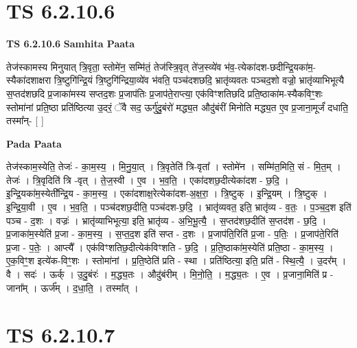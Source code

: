 \documentclass[17pt]{extarticle}
\begin{document}
\section*{ TS 6.2.10.6 }

\textbf{TS 6.2.10.6 } \newline
\textbf{Samhita Paata} \newline

तेज॑स्कामस्य मिनुयात् त्रि॒वृता॒ स्तोमे॑न॒ सम्मि॑तं॒ तेज॑स्त्रि॒वृत् ते॑ज॒स्व्ये॑व भ॑व॒-त्येका॑दश-छदीन्द्रि॒यका॑म॒-स्यैका॑दशाक्षरा त्रि॒ष्टुगि॑न्द्रि॒यं त्रि॒ष्टुगि॑न्द्रिया॒व्ये॑व भ॑वति॒ पञ्च॑दशछदि॒ भ्रातृ॑व्यवतः पञ्चद॒शो वज्रो॒ भ्रातृ॑व्याभिभूत्यै स॒प्तद॑शछदि प्र॒जाका॑मस्य सप्तद॒शः प्र॒जाप॑तिः प्र॒जाप॑ते॒राप्त्या॒ एक॑विꣳशतिछदि प्रति॒ष्ठाका॑म-स्यैकविꣳ॒॒शः स्तोमा॑नां प्रति॒ष्ठा प्रति॑ष्ठित्या उ॒दरं॒ ॅवै सद॒ ऊर्गु॑दु॒बंरो॑ मद्ध्य॒त औदु॑बंरीं मिनोति मद्ध्य॒त ए॒व प्र॒जाना॒मूर्जं॑ दधाति॒ तस्मा᳚न्- [  ] \newline

\textbf{Pada Paata} \newline

तेज॑स्काम॒स्येति॒ तेजः॑ - का॒म॒स्य॒ । मि॒नु॒या॒त् । त्रि॒वृतेति॑ त्रि-वृता᳚ । स्तोमे॑न । सम्मि॑त॒मिति॒ सं - मि॒त॒म् । तेजः॑ । त्रि॒वृदिति॑ त्रि -वृत् । ते॒ज॒स्वी । ए॒व । भ॒व॒ति॒ । एका॑दशछ॒दीत्येका॑दश - छ॒दि॒ । इ॒न्द्रि॒यका॑म॒स्येती᳚न्द्रि॒य - का॒म॒स्य॒ । एका॑दशाक्ष॒रेत्येका॑दश-अ॒क्ष॒रा॒ । त्रि॒ष्टुक् । इ॒न्द्रि॒यम् । त्रि॒ष्टुक् । इ॒न्द्रि॒या॒वी । ए॒व । भ॒व॒ति॒ । पञ्च॑दशछ॒दीति॒ पञ्च॑दश-छ॒दि॒ । भ्रातृ॑व्यवत॒ इति॒ भ्रातृ॑व्य - व॒तः॒ । प॒ञ्च॒द॒श इति॑ पञ्च - द॒शः । वज्रः॑ । भ्रातृ॑व्याभिभूत्या॒ इति॒ भ्रातृ॑व्य - अ॒भि॒भू॒त्यै॒ । स॒प्तद॑शछ॒दीति॑ स॒प्तद॑श - छ॒दि॒ । प्र॒जाका॑म॒स्येति॑ प्र॒जा - का॒म॒स्य॒ । स॒प्त॒द॒श इति॑ सप्त - द॒शः । प्र॒जाप॑ति॒रिति॑ प्र॒जा - प॒तिः॒ । प्र॒जाप॑ते॒रिति॑ प्र॒जा - प॒तेः॒ । आप्त्यै᳚ । एक॑विꣳशतिछ॒दीत्येक॑विꣳशति - छ॒दि॒ । प्र॒ति॒ष्ठाका॑म॒स्येति॑ प्रति॒ष्ठा - का॒म॒स्य॒ । ए॒क॒विꣳ॒॒श इत्ये॑क-विꣳ॒॒शः । स्तोमा॑नां । प्र॒ति॒ष्ठेति॑ प्रति - स्था । प्रति॑ष्ठित्या॒ इति॒ प्रति॑ - स्थि॒त्यै॒ । उ॒दर᳚म् । वै । सदः॑ । ऊर्क् । उ॒दु॒बंरः॑ । म॒द्ध्य॒तः । औदु॑बंरीम् । मि॒नो॒ति॒ । म॒द्ध्य॒तः । ए॒व । प्र॒जाना॒मिति॑ प्र - जाना᳚म् । ऊर्ज᳚म् । द॒धा॒ति॒ । तस्मा᳚त् ।  \newline




\section*{ TS 6.2.10.7 }
\end{document}
